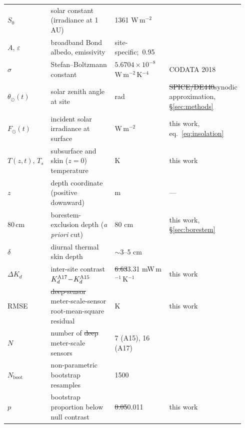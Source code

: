 \documentclass[11pt]{article}
\makeatletter
\newcommand{\zborestem}{80\,\si{\centi\meter}}
\let\sout@orig\sout
\renewcommand{\sout}[1]{\ifmmode\text{\sout@orig{\ensuremath{#1}}}\else\sout@orig{#1}\fi}
\newcommand{\new}[1]{\textcolor{green!60!black}{#1}}
\newcommand{\old}[1]{\textcolor{red!70!black}{\sout{#1}}}
\newcommand{\new}[1]{\textcolor{green!60!black}{#1}}
\newcommand{\old}[1]{}
\newcommand{\new}[1]{#1}
\newcommand{\old}[1]{}
\makeatother
\begin{document}
{\begin{tabular}{@{}p{0.10\linewidth}p{0.40\linewidth}p{0.28\linewidth}p{0.16\linewidth}@{}}
$S_0$              & solar constant (irradiance at 1 AU)                   & 1361 W\,m$^{-2}$                             & \citet{kopp2011} \\
$A$, $\varepsilon$ & broadband Bond albedo, emissivity                     & site-specific;\ 0.95                         & \citet{vasavada2012,bandfield2015} \\
$\sigma$           & Stefan--Boltzmann constant                            & $5.6704\!\times\!10^{-8}$ W\,m$^{-2}$\,K$^{-4}$ & CODATA 2018 \\
$\theta_\odot(t)$  & solar zenith angle at site                            & rad                                          & \old{SPICE/DE440}\new{synodic approximation, \S\ref{sec:methods}} \\
$F_\odot(t)$       & incident solar irradiance at surface                  & W\,m$^{-2}$                                  & this work, eq.~\ref{eq:insolation} \\
$T(z,t),\,T_s$     & subsurface and skin ($z\!=\!0$) temperature           & K                                            & this work \\
$z$                & depth coordinate (positive downward)                  & m                                            & --- \\
$\zborestem$       & borestem-exclusion depth (\emph{a priori} cut)        & 80 cm                                        & this work, \S\ref{sec:borestem} \\
$\delta$           & diurnal thermal skin depth                            & $\sim$3--5 cm                                & \citet{hayne2017} \\
$\Delta K_d$       & inter-site contrast $K_d^{\rm A17}\!-\!K_d^{\rm A15}$ & \old{6.63}\new{3.31} mW\,m$^{-1}$\,K$^{-1}$                  & this work \\
RMSE               & \old{deep-sensor }\new{meter-scale-sensor }root-mean-square residual                 & K                                            & this work \\
$N$                & number of \old{deep }\new{meter-scale }sensors                                & 7 (A15), 16 (A17)                            & \citet{nagihara2018} \\
$N_\mathrm{boot}$  & non-parametric bootstrap resamples                    & 1500                                         & \citet{efron1993} \\
$p$                & bootstrap proportion below null contrast              & \old{0.05}\new{0.011}                                         & this work \\
\bottomrule
\end{tabular}

}
\end{document}
